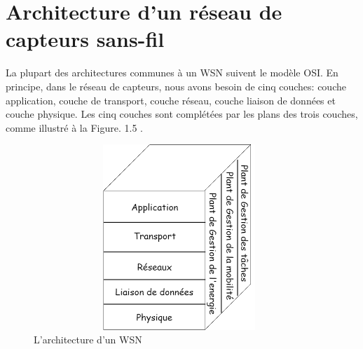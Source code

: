 \section{Architecture d’un réseau de capteurs sans-fil}
La plupart des architectures communes à un WSN suivent le modèle OSI. En principe, dans le réseau de capteurs, nous avons besoin de cinq couches: couche application, couche de transport, couche réseau, couche liaison de données et couche physique. Les cinq couches sont complétées par les plans des trois couches, comme illustré à la Figure. 1.5 .
\begin{figure}[h]
	\centering
	\includegraphics[width=11cm,height=7cm]{Chap1/5.png}
	\caption{L’architecture d’un WSN}
	\label{fig:AWSN}
\end{figure}


